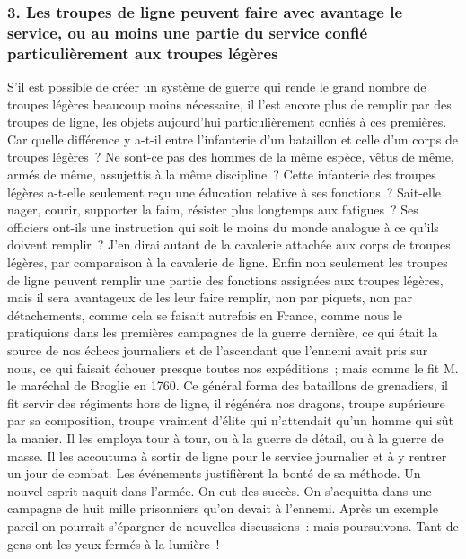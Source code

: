 \documentclass[french,twoside]{book} %
\begin{document}
\subsubsection[{3. Les troupes de ligne peuvent faire avec avantage le service, ou au moins une partie du service confié particulièrement aux troupes légères}]{3. Les troupes de ligne peuvent faire avec avantage le service, ou au moins une partie du service confié particulièrement aux troupes légères}
\noindent S’il est possible de créer un système de guerre qui rende le grand nombre de troupes légères beaucoup moins nécessaire, il l’est encore plus de remplir par des troupes de ligne, les objets aujourd’hui particulièrement confiés à ces premières. Car quelle différence y a-t-il entre l’infanterie d’un bataillon et celle d’un corps de troupes légères ? Ne sont-ce pas des hommes de la même espèce, vêtus de même, armés de même, assujettis à la même discipline ? Cette infanterie des troupes légères a-t-elle seulement reçu une éducation relative à ses fonctions ? Sait-elle nager, courir, supporter la faim, résister plus longtemps aux fatigues ? Ses officiers ont-ils une instruction qui soit le moins du monde analogue à ce qu’ils doivent remplir ? J’en dirai autant de la cavalerie attachée aux corps de troupes légères, par comparaison à la cavalerie de ligne. Enfin non seulement les troupes de ligne peuvent remplir une partie des fonctions assignées aux troupes légères, mais il sera avantageux de les leur faire remplir, non par piquets, non par détachements, comme cela se faisait autrefois en France, comme nous le pratiquions dans les premières campagnes de la guerre dernière, ce qui était la source de nos échecs journaliers et de l’ascendant que l’ennemi avait pris sur nous, ce qui faisait échouer presque toutes nos expéditions ; mais comme le fit M. le maréchal de Broglie en 1760. Ce général forma des bataillons de grenadiers, il fit servir des régiments hors de ligne, il régénéra nos dragons, troupe supérieure par sa composition, troupe vraiment d’élite qui n’attendait qu’un homme qui sût la manier. Il les employa tour à tour, ou à la guerre de détail, ou à la guerre de masse. Il les accoutuma à sortir de ligne pour le service journalier et à y rentrer un jour de combat. Les événements justifièrent la bonté de sa méthode. Un nouvel esprit naquit dans l’armée. On eut des succès. On s’acquitta dans une campagne de huit mille prisonniers qu’on devait à l’ennemi. Après un exemple pareil on pourrait s’épargner de nouvelles discussions : mais poursuivons. Tant de gens ont les yeux fermés à la lumière !\par
\end{document}
